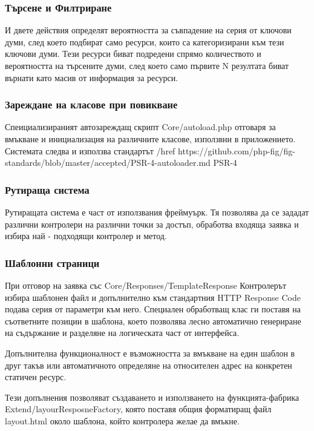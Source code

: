 

\subsubsection{Търсене и Филтриране}

И двете действия определят вероятността за съвпадение на
серия от ключови думи, след което подбират само ресурси,
които са категоризирани към тези ключови думи. Тези
ресурси биват подредени спрямо количеството и
вероятността на търсените думи, след което само първите
N резултата биват върнати като масив от информация за
ресурси.


\subsubsection{Зареждане на класове при повикване}

Спеициализираният автозареждащ скрипт Core/autoload.php
отговаря за вмъкване и инициализация на различните
класове, използвни в приложението. Системата следва
и използва стандартът /href
    {https://github.com/php-fig/fig-standards/blob/master/accepted/PSR-4-autoloader.md}
    {PSR-4}


\subsubsection{Рутираща система}

Рутиращата система е част от използвания фреймуърк.
Тя позволява да се зададат различни контролери на различни
точки за достъп, обработва входяща заявка и избира
най - подходящи контролер и метод.


\subsubsection{Шаблонни страници}

При отговор на заявка със Core/Responses/TemplateResponse
Контролерът избира шаблонен файл и допълнително към
стандартния HTTP Response Code подава серия от
параметри към него. Специален обработващ клас ги
поставя на съответните позиции в шаблона, което позволява
лесно автоматично генериране на съдържание и разделяне на
логическата част от интерфейса.

Допълнителна функционалност е възможността за вмъкване
на един шаблон в друг такъв или автоматичното определяне
на относителен адрес на конкретен статичен ресурс.

Тези допълнения позволяват създаването и използването на
функцията-фабрика Extend/layourResposneFactory,
която поставя общия форматиращ файл layout.html около
шаблона, който контролера желае да вмъкне.



